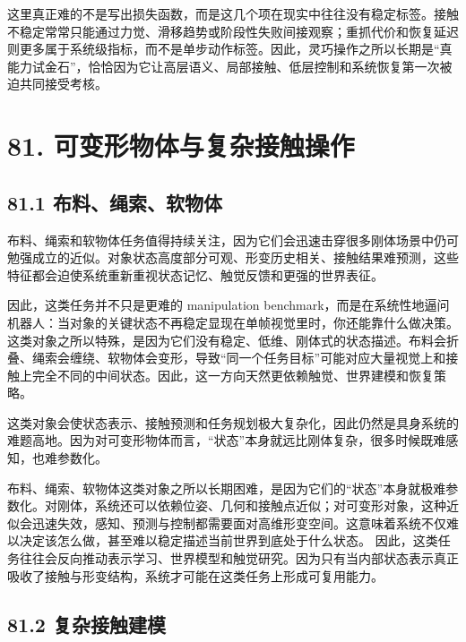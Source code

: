 这里真正难的不是写出损失函数，而是这几个项在现实中往往没有稳定标签。接触不稳定常常只能通过力觉、滑移趋势或阶段性失败间接观察；重抓代价和恢复延迟则更多属于系统级指标，而不是单步动作标签。因此，灵巧操作之所以长期是“真能力试金石”，恰恰因为它让高层语义、局部接触、低层控制和系统恢复第一次被迫共同接受考核。

\section*{81. 可变形物体与复杂接触操作}

\subsection*{81.1 布料、绳索、软物体}


布料、绳索和软物体任务值得持续关注，因为它们会迅速击穿很多刚体场景中仍可勉强成立的近似。对象状态高度部分可观、形变历史相关、接触结果难预测，这些特征都会迫使系统重新重视状态记忆、触觉反馈和更强的世界表征。

因此，这类任务并不只是更难的 manipulation benchmark，而是在系统性地逼问机器人：当对象的关键状态不再稳定显现在单帧视觉里时，你还能靠什么做决策。 这类对象之所以特殊，是因为它们没有稳定、低维、刚体式的状态描述。布料会折叠、绳索会缠绕、软物体会变形，导致“同一个任务目标”可能对应大量视觉上和接触上完全不同的中间状态。因此，这一方向天然更依赖触觉、世界建模和恢复策略。

这类对象会使状态表示、接触预测和任务规划极大复杂化，因此仍然是具身系统的难题高地。因为对可变形物体而言，“状态”本身就远比刚体复杂，很多时候既难感知，也难参数化。

布料、绳索、软物体这类对象之所以长期困难，是因为它们的“状态”本身就极难参数化。对刚体，系统还可以依赖位姿、几何和接触点近似；对可变形对象，这种近似会迅速失效，感知、预测与控制都需要面对高维形变空间。这意味着系统不仅难以决定该怎么做，甚至难以稳定描述当前世界到底处于什么状态。 因此，这类任务往往会反向推动表示学习、世界模型和触觉研究。因为只有当内部状态表示真正吸收了接触与形变结构，系统才可能在这类任务上形成可复用能力。

\subsection*{81.2 复杂接触建模}


